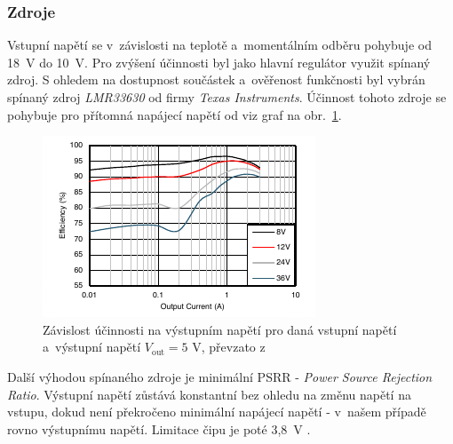 \documentclass[twoside]{ctuthesis}
\newcommand{\mt}[1]{\text{#1}}
\theoremstyle{plain}
\theoremstyle{definition}
\theoremstyle{note}
\begin{document}
			\subsubsection{Zdroje}
			Vstupní napětí se v~závislosti na teplotě a~momentálním odběru pohybuje od 18~V do 10~V. Pro zvýšení účinnosti byl jako hlavní regulátor využit spínaný zdroj. S ohledem na dostupnost součástek a~ověřenost funkčnosti byl vybrán spínaný zdroj \textit{LMR33630} od firmy \textit{Texas Instruments}. Účinnost tohoto zdroje se pohybuje pro přítomná napájecí napětí od viz graf na obr.~\ref{graf:lmr}.
			\begin{figure}[hbtp]
				\centering
				\includegraphics[width=.6\textwidth]{Graphs/lmr33630eff.pdf}
				\caption{Závislost účinnosti na výstupním napětí pro daná vstupní napětí a~výstupní napětí $V_\mt{out}= 5\mt{ V}$, převzato z~\cite{dsh_lmr}}
				\label{graf:lmr}
			\end{figure}

			Další výhodou spínaného zdroje je minimální PSRR - \textit{Power Source Rejection Ratio}. Výstupní napětí zůstává konstantní bez ohledu na změnu napětí na vstupu, dokud není překročeno minimální napájecí napětí - v~našem případě rovno výstupnímu napětí. Limitace čipu je poté 3{,}8~V \cite{dsh_lmr}.
			
\end{document}
